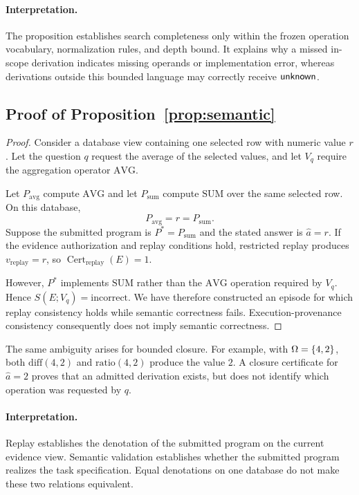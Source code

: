 \paragraph{Interpretation.}
The proposition establishes search completeness only within the
frozen operation vocabulary, normalization rules, and depth
bound. It explains why a missed in-scope derivation indicates
missing operands or implementation error, whereas derivations
outside this bounded language may correctly receive
$\mathsf{unknown}$.

\subsection{Proof of Proposition~\ref{prop:semantic}}

\begin{proof}
Consider a database view containing one selected row with numeric
value $r$. Let the question $q$ request the average of the selected
values, and let $V_q$ require the aggregation operator
$\mathrm{AVG}$.

Let $P_{\mathrm{avg}}$ compute $\mathrm{AVG}$ and let
$P_{\mathrm{sum}}$ compute $\mathrm{SUM}$ over the same selected
row. On this database,
\[
P_{\mathrm{avg}}=r=P_{\mathrm{sum}}.
\]
Suppose the submitted program is $P^*=P_{\mathrm{sum}}$ and the
stated answer is $\hat a=r$. If the evidence authorization and
replay conditions hold, restricted replay produces
$v_{\mathrm{replay}}=r$, so
$\operatorname{Cert}_{\mathrm{replay}}(E)=1$.

However, $P^*$ implements $\mathrm{SUM}$ rather than the
$\mathrm{AVG}$ operation required by $V_q$. Hence
$S(E;V_q)=\mathrm{incorrect}$. We have therefore constructed an
episode for which replay consistency holds while semantic
correctness fails. Execution-provenance consistency consequently
does not imply semantic correctness.
\end{proof}

The same ambiguity arises for bounded closure. For example, with
$\Omega=\{4,2\}$, both
$\mathrm{diff}(4,2)$ and $\mathrm{ratio}(4,2)$ produce the value
$2$. A closure certificate for $\hat a=2$ proves that an admitted
derivation exists, but does not identify which operation was
requested by $q$.

\paragraph{Interpretation.}
Replay establishes the denotation of the submitted program on the
current evidence view. Semantic validation establishes whether the
submitted program realizes the task specification. Equal
denotations on one database do not make these two relations
equivalent.

